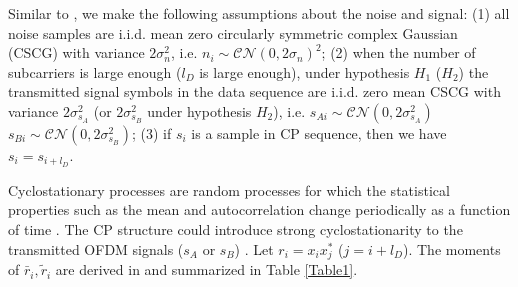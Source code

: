 Similar to \cite{axell2011optimal}, we make the following assumptions about the noise and signal: (1) all noise samples are i.i.d. mean zero circularly symmetric complex Gaussian (CSCG) with variance $2\sigma_n^2$, i.e. $n_i \sim \mathcal{CN}(0, 2\sigma_n)^2$; (2) when the number of subcarriers is large enough ($l_D$ is large enough), under hypothesis $H_1$ ($H_2$) the transmitted signal symbols in the data sequence are i.i.d. zero mean CSCG with variance $2\sigma_{s_A}^2$ (or $2\sigma_{s_B}^2$ under hypothesis $H_2$), i.e. $s_{Ai} \sim \mathcal{CN}(0, 2\sigma_{s_A}^2)$ $s_{Bi} \sim \mathcal{CN}(0, 2\sigma_{s_B}^2)$; (3) if $s_i$ is a sample in CP sequence, then we have $s_i = s_{i+l_D}$. 

Cyclostationary processes are random processes for which the statistical properties such as the mean and autocorrelation change periodically as a function of time \cite{gardner1986statistical}. 
The CP structure could introduce strong cyclostationarity to the transmitted OFDM signals ($s_A$ or $s_B$) \cite{lunden2010robust}. 
Let $r_i=x_ix_j^\ast$ ($j=i+l_D$). The moments of $\bar{r}_i, \tilde{r}_i$ are derived in \cite{axell2011optimal} and summarized in Table \ref{Table1}. 

